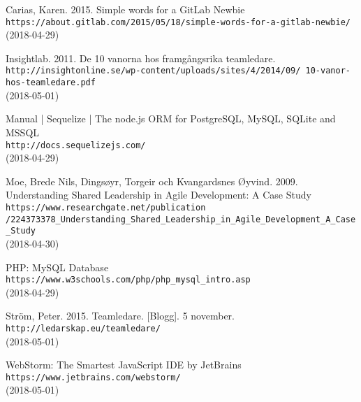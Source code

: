 \begin{thebibliography}{99}

Carias, Karen. 2015. Simple words for a GitLab Newbie
\\\texttt{https://about.gitlab.com/2015/05/18/simple-words-for-a-gitlab-newbie/}\\
(2018-04-29)

Insightlab. 2011. De 10 vanorna hos framgångsrika teamledare.\\\texttt{http://insightonline.se/wp-content/uploads/sites/4/2014/09/
10-vanor-hos-teamledare.pdf}\\
(2018-05-01)

Manual | Sequelize | The node.js ORM for PostgreSQL, MySQL, SQLite and MSSQL \\\texttt{http://docs.sequelizejs.com/}\\
(2018-04-29)

Moe, Brede Nils, Dingsøyr, Torgeir och Kvangardsnes Øyvind. 2009. Understanding Shared Leadership in Agile Development: A Case Study
\\\texttt{https://www.researchgate.net/publication\\/224373378_Understanding_Shared_Leadership_in_Agile_Development_A_Case_Study}
\\(2018-04-30)

PHP: MySQL Database \\\texttt{https://www.w3schools.com/php/php_mysql_intro.asp} \\
(2018-04-29)

Ström, Peter. 2015. Teamledare. [Blogg]. 5 november. \\\texttt{http://ledarskap.eu/teamledare/} \\
(2018-05-01)

WebStorm: The Smartest JavaScript IDE by JetBrains \\\texttt{https://www.jetbrains.com/webstorm/}\\
(2018-05-01)

\end{thebibliography}